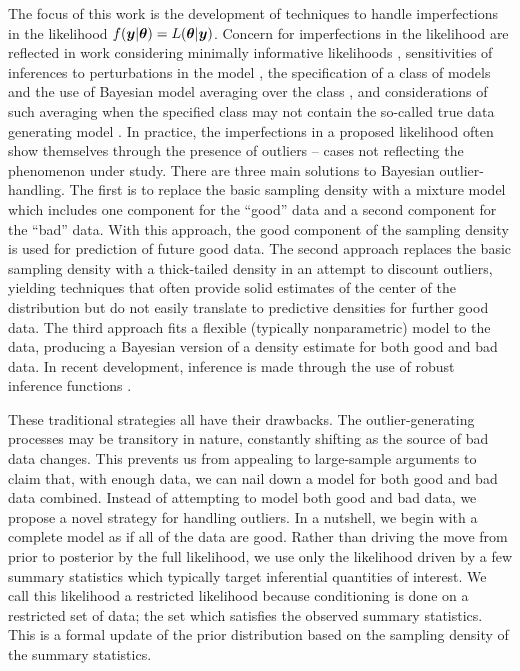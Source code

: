 \documentclass[ba]{imsart}
\def\bth{\mbox{\boldmath $\theta$}}
\newcommand{\by}{\mbox{\boldmath $y$}}
\begin{document}
The focus of this work is the development of techniques to handle imperfections in the likelihood $f(\by|\bth) = L(\bth|\by)$. Concern for imperfections in the likelihood are reflected in work considering minimally informative likelihoods \citep{yuan1999minimally}, sensitivities of inferences to perturbations in the model \citep{zhu2011}, the specification of a class of models and the use of Bayesian model averaging over the class \citep{clyde2004}, and considerations of such averaging when the specified class may not contain the so-called true data generating model \citep{bernardo2000, clyde2013, clarke2013Complete}.   In practice, the imperfections in a proposed likelihood often show themselves through the presence of outliers -- cases not reflecting the phenomenon under study. There are three main solutions to Bayesian outlier-handling.  The first is to replace the basic sampling density with a mixture model which includes one component for the ``good'' data and a second component for the ``bad'' data.  With this approach, the good component of the sampling density is used for prediction of future good data.  The second approach replaces the
basic sampling density with a thick-tailed density in an attempt to discount outliers, yielding techniques that 
often provide solid estimates of the center of the distribution but do not easily translate to predictive densities for further good data.  The third approach fits a flexible (typically nonparametric) model to  the data, producing a Bayesian version of a density estimate for both good and bad data.  In recent development, inference is made through the use of robust inference functions \citep{lee2014}.  

These traditional strategies  all have their drawbacks.  The outlier-generating processes 
may be transitory in nature, constantly shifting as the source of bad data changes.  This prevents us from appealing to large-sample arguments to claim that, with enough data, we can nail down a model for both good and bad data combined.  Instead of attempting to model both good and bad data, we propose a novel strategy for handling outliers. In a nutshell, we begin with a complete model  as if all of the data are good. Rather than driving the move from prior to posterior  by the full likelihood, we use only the likelihood driven by a few summary statistics which typically target inferential quantities
of interest.  We call this likelihood a restricted likelihood because conditioning is done on a restricted set of data; the set which satisfies the observed summary statistics. This is a formal update of the prior distribution based on the sampling density of the summary statistics. %
\end{document}
